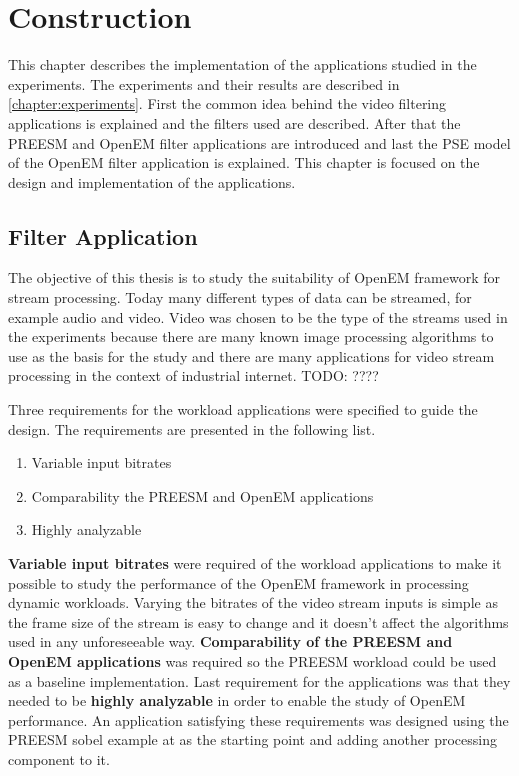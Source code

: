 \chapter{Construction}
\label{chapter:construction}
This chapter describes the implementation of the applications studied in the
experiments. The experiments and their results are described in
\ref{chapter:experiments}. First the common idea behind the video filtering
applications is explained and the filters used are described. After that the
PREESM and OpenEM filter applications are introduced and last the PSE model of
the OpenEM filter application is explained. This chapter is focused on the
design and implementation of the applications.

\section{Filter Application}
\label{sec:filterapp}
The objective of this thesis is to study the suitability of OpenEM framework
for stream processing. Today many different types of data can be streamed, for
example audio and video. Video was chosen to be the type of the streams used in
the experiments because there are many known image processing algorithms to use
as the basis for the study and there are many applications for video stream
processing in the context of industrial internet. TODO: ????

Three requirements for the workload applications were specified to guide the
design. The requirements are presented in the following list.

\begin{enumerate}
    \item{Variable input bitrates}
    \item{Comparability the PREESM and OpenEM applications}
    \item{Highly analyzable}
\end{enumerate}

\textbf{Variable input bitrates} were required of the workload applications to
make it possible to study the performance of the OpenEM framework in processing
dynamic workloads. Varying the bitrates of the video stream inputs is simple as
the frame size of the stream is easy to change and it doesn't affect the
algorithms used in any unforeseeable way. \textbf{Comparability of the PREESM
and OpenEM applications} was required so the PREESM workload could be used as a
baseline implementation. Last requirement for the applications was that they
needed to be \textbf{highly analyzable} in order to enable the study of OpenEM
performance. An application satisfying these requirements was designed using the
PREESM sobel example at \cite{preesmtut} as the starting point and adding
another processing component to it.

